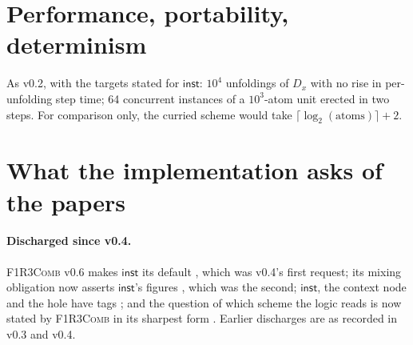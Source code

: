 \documentclass[11pt,a4paper]{article}
\newcommand{\Comb}{\textsc{F1R3Comb}}
\theoremstyle{definition}
\theoremstyle{plain}
\newcommand{\inst}{\mathsf{inst}}
\begin{document}
\section{Performance, portability, determinism}\label{sec:perf}

As v0.2, with the targets stated for $\inst$: $10^{4}$ unfoldings of $D_{x}$
with no rise in per-unfolding step time; 64 concurrent instances of a
$10^{3}$-atom unit erected in two steps. For comparison only, the curried
scheme would take $\lceil\log_{2}(\text{atoms})\rceil + 2$.

\section{What the implementation asks of the papers}\label{sec:paper}

\paragraph{Discharged since v0.4.} \Comb{} v0.6 makes $\inst$ its default
\cite[Dec.~5.19]{combspec}, which was v0.4's first request; its mixing
obligation now asserts $\inst$'s figures \cite[Obl.~11.3]{combspec}, which was
the second; $\inst$, the context node and the hole have tags
\cite[Req.~4.11]{combspec}; and the question of which scheme the logic reads
is now stated by \Comb{} in its sharpest form \cite[\S14, item~5]{combspec}.
Earlier discharges are as recorded in v0.3 and v0.4.
\end{document}
